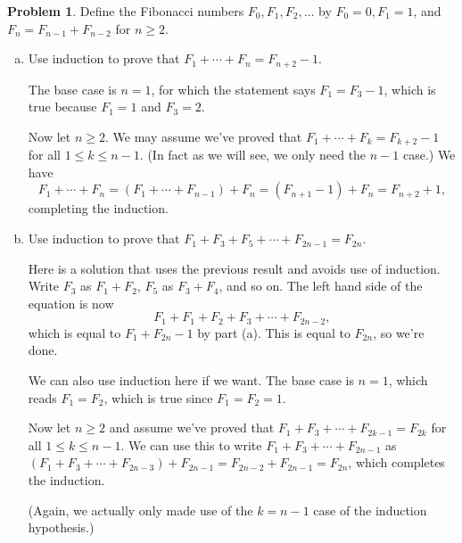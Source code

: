 \documentclass[11pt,oneside]{amsart}
\theoremstyle{definition}
\newtheorem{problem}{Problem}
\begin{document}
    \begin{problem}
        Define the Fibonacci numbers $F_0,F_1,F_2,\dots$ by $F_0=0,F_1=1$, and $F_n=F_{n-1}+F_{n-2}$ for $n\geq 2$.
        \begin{enumerate}[(a)]
            \item Use induction to prove that $F_1+\cdots+F_n=F_{n+2}-1$.
            \begin{solution}
                The base case is $n=1$, for which the statement says $F_1=F_3-1$, which is true because $F_1=1$ and $F_3=2$.

                Now let $n\geq 2$. We may assume we've proved that $F_1+\cdots+F_k=F_{k+2}-1$ for all $1\leq k\leq n-1$. (In fact as we will see, we only need the $n-1$ case.) We have
                \[F_1+\cdots+F_n=(F_1+\cdots+F_{n-1})+F_n=(F_{n+1}-1)+F_n=F_{n+2}+1,\]
                completing the induction.
            \end{solution}
            \item Use induction to prove that $F_1+F_3+F_5+\cdots+F_{2n-1}=F_{2n}$.
            \begin{solution}
                Here is a solution that uses the previous result and avoids use of induction. Write $F_3$ as $F_1+F_2$, $F_5$ as $F_3+F_4$, and so on. The left hand side of the equation is now
                \[F_1+F_1+F_2+F_3+\cdots+F_{2n-2},\]
                which is equal to $F_1+F_{2n}-1$ by part (a). This is equal to $F_{2n}$, so we're done.
            \end{solution}
            \begin{solution}
                We can also use induction here if we want. The base case is $n=1$, which reads $F_1=F_2$, which is true since $F_1=F_2=1$.

                Now let $n\geq 2$ and assume we've proved that $F_1+F_3+\cdots+F_{2k-1}=F_{2k}$ for all $1\leq k\leq n-1$. We can use this to write $F_1+F_3+\cdots+F_{2n-1}$ as $(F_1+F_3+\cdots+F_{2n-3})+F_{2n-1}=F_{2n-2}+F_{2n-1}=F_{2n}$, which completes the induction.

                (Again, we actually only made use of the $k=n-1$ case of the induction hypothesis.)
            \end{solution}
        \end{enumerate}
    \end{problem}
\end{document}
